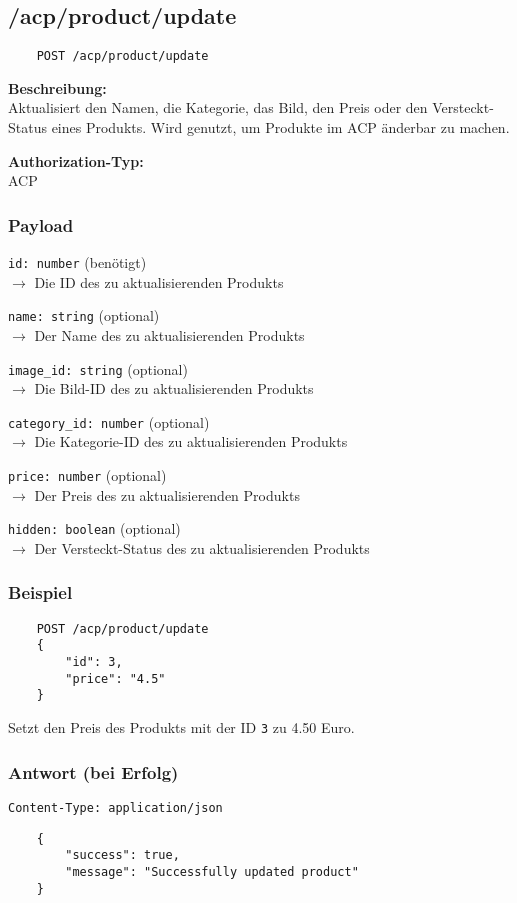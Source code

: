 \subsection{/acp/product/update}

\begin{lstlisting}
    POST /acp/product/update
\end{lstlisting}

\textbf{Beschreibung:} \\
Aktualisiert den Namen, die Kategorie, das Bild, den Preis oder den Versteckt-Status eines Produkts. Wird genutzt, um Produkte im ACP änderbar zu machen.

\textbf{Authorization-Typ:} \\
ACP

\subsubsection{Payload}

\lstinline{id: number} (benötigt) \\
$\rightarrow$ Die ID des zu aktualisierenden Produkts

\lstinline{name: string} (optional) \\
$\rightarrow$ Der Name des zu aktualisierenden Produkts

\lstinline{image_id: string} (optional) \\
$\rightarrow$ Die Bild-ID des zu aktualisierenden Produkts

\lstinline{category_id: number} (optional) \\
$\rightarrow$ Die Kategorie-ID des zu aktualisierenden Produkts

\lstinline{price: number} (optional) \\
$\rightarrow$ Der Preis des zu aktualisierenden Produkts

\lstinline{hidden: boolean} (optional) \\
$\rightarrow$ Der Versteckt-Status des zu aktualisierenden Produkts

\subsubsection{Beispiel}

\begin{lstlisting}
    POST /acp/product/update
    {
        "id": 3,
        "price": "4.5"
    }
\end{lstlisting}

Setzt den Preis des Produkts mit der ID \lstinline{3} zu 4.50 Euro.

\subsubsection{Antwort (bei Erfolg)}

\lstinline{Content-Type: application/json}
\begin{lstlisting}
    {
        "success": true, 
        "message": "Successfully updated product"
    }
\end{lstlisting}